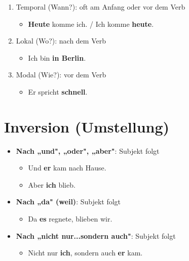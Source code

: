 \begin{enumerate}
    \item Temporal (Wann?): oft am Anfang oder vor dem Verb
        \begin{itemize}
            \item \textbf{Heute} komme ich. / Ich komme \textbf{heute}.
        \end{itemize}
    \item Lokal (Wo?): nach dem Verb
        \begin{itemize}
            \item Ich bin \textbf{in Berlin}.
        \end{itemize}
    \item Modal (Wie?): vor dem Verb
        \begin{itemize}
            \item Er spricht \textbf{schnell}.
        \end{itemize}
\end{enumerate}

\section{Inversion (Umstellung)}
\label{sec:Inversion}

\begin{itemize}
    \item \textbf{Nach „und", „oder", „aber"}: Subjekt folgt
        \begin{itemize}
            \item Und \textbf{er} kam nach Hause.
            \item Aber \textbf{ich} blieb.
        \end{itemize}
    \item \textbf{Nach „da" (weil)}: Subjekt folgt
        \begin{itemize}
            \item Da \textbf{es} regnete, blieben wir.
        \end{itemize}
    \item \textbf{Nach „nicht nur...sondern auch"}: Subjekt folgt
        \begin{itemize}
            \item Nicht nur \textbf{ich}, sondern auch \textbf{er} kam.
        \end{itemize}
\end{itemize}

\chapterend
